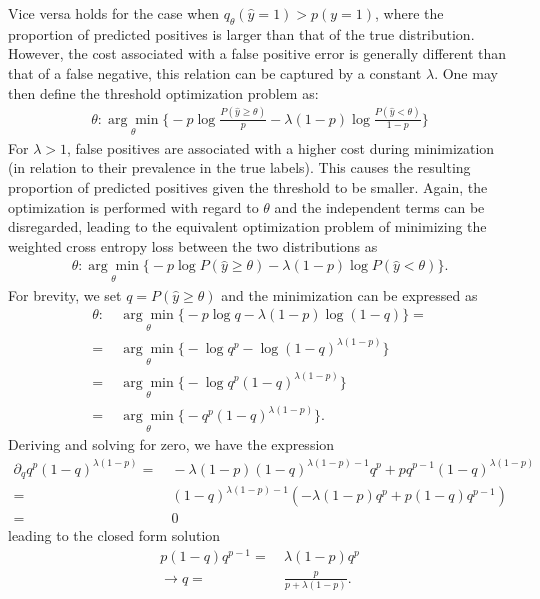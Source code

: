 \documentclass{article}
\begin{document}
Vice versa holds for the case when $q_\theta(\hat{y}=1) > p(y=1)$, where the proportion of predicted positives is larger than that of the true distribution.
However, the cost associated with a false positive error is generally different than that of a false negative, this relation can be captured by a constant $\lambda$. One may then define the threshold optimization problem as:  
\begin{align}
    \theta: \underset{\theta}{\arg \min} \Big\{ - p \log \frac{P(\hat{y}\geq \theta)}{p} - \lambda (1-p) \log \frac{P(\hat{y} < \theta)}{1-p} \Big \}
\end{align}
For $\lambda>1$, false positives are associated with a higher cost during minimization (in relation to their prevalence in the true labels). This causes the resulting proportion of predicted positives given the threshold to be smaller. %
Again, the optimization is performed with regard to $\theta$ and the independent terms can be disregarded, leading to the equivalent optimization problem of minimizing the weighted cross entropy loss between the two distributions as
\begin{align}
\label{eq:threshold} 
\theta: \underset{\theta}{\arg \min} \Big\{ - p \log P(\hat{y}\geq \theta) - \lambda (1-p) \log P(\hat{y} < \theta) \Big \} \text{.}
\end{align}
For brevity, we set $q = P(\hat{y}\geq \theta)$ and the minimization can be expressed as
\begin{align*}
\theta:& \ \underset{\theta}{\arg \min} \Big\{ - p \log q - \lambda (1-p) \log (1-q) \Big \} = \\
=& \ \underset{\theta}{\arg \min} \Big\{ - \log q^p - \log (1-q)^{\lambda(1-p)} \Big \} \\
=& \ \underset{\theta}{\arg \min} \Big\{ - \log q^p (1-q)^{\lambda(1-p)} \Big \} \\
=& \ \underset{\theta}{\arg \min} \Big\{ - q^p (1-q)^{\lambda(1-p)} \Big \} \text{.}
\end{align*}
Deriving and solving for zero, we have the expression
\begin{align*}
\partial_q q^p (1-q)^{\lambda(1-p)} =& \ -\lambda(1-p)(1-q)^{\lambda(1-p)-1}q^p + pq^{p-1}(1-q)^{\lambda(1-p)} \\
=& \ (1-q)^{\lambda(1-p)-1}(-\lambda(1-p)q^p + p(1-q)q^{p-1}) \\
=& \ 0
\end{align*}
leading to the closed form solution
\begin{align}
\label{eq:pos}
p(1-q)q^{p-1} =& \ \lambda(1-p)q^p \\
\rightarrow q =& \ \frac{p}{p + \lambda(1-p)}\text{.}
\end{align}
\end{document}
